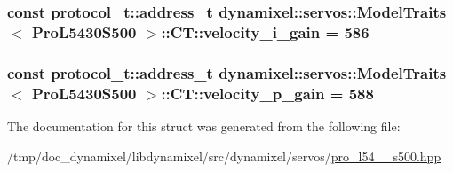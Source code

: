 \subsubsection[{\texorpdfstring{velocity\+\_\+i\+\_\+gain}{velocity_i_gain}}]{\setlength{\rightskip}{0pt plus 5cm}const {\bf protocol\+\_\+t\+::address\+\_\+t} {\bf dynamixel\+::servos\+::\+Model\+Traits}$<$ {\bf Pro\+L5430\+S500} $>$\+::C\+T\+::velocity\+\_\+i\+\_\+gain = 586\hspace{0.3cm}{\ttfamily [static]}}\hypertarget{structdynamixel_1_1servos_1_1_model_traits_3_01_pro_l5430_s500_01_4_1_1_c_t_ad10e1217ce2e776ec790444f4f2a147f}{}\label{structdynamixel_1_1servos_1_1_model_traits_3_01_pro_l5430_s500_01_4_1_1_c_t_ad10e1217ce2e776ec790444f4f2a147f}
\subsubsection[{\texorpdfstring{velocity\+\_\+p\+\_\+gain}{velocity_p_gain}}]{\setlength{\rightskip}{0pt plus 5cm}const {\bf protocol\+\_\+t\+::address\+\_\+t} {\bf dynamixel\+::servos\+::\+Model\+Traits}$<$ {\bf Pro\+L5430\+S500} $>$\+::C\+T\+::velocity\+\_\+p\+\_\+gain = 588\hspace{0.3cm}{\ttfamily [static]}}\hypertarget{structdynamixel_1_1servos_1_1_model_traits_3_01_pro_l5430_s500_01_4_1_1_c_t_ad39c3621b051576709612be62a26f9a1}{}\label{structdynamixel_1_1servos_1_1_model_traits_3_01_pro_l5430_s500_01_4_1_1_c_t_ad39c3621b051576709612be62a26f9a1}


The documentation for this struct was generated from the following file\+:\begin{DoxyCompactItemize}
\item 
/tmp/doc\+\_\+dynamixel/libdynamixel/src/dynamixel/servos/\hyperlink{pro__l54__30__s500_8hpp}{pro\+\_\+l54\+\_\+\_\+s500.\+hpp}\end{DoxyCompactItemize}
